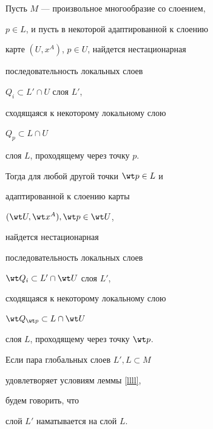 \begin{lem} \label{llll}


Пусть $M$ --- произвольное многообразие со слоением,


$p \in L$, и пусть в некоторой адаптированной к слоению


карте $( U, x^A )$, $p \in U$, найдется нестационарная


последовательность локальных слоев


$Q_{i} \subset L' \cap U$ слоя $L'$,


сходящаяся к некоторому локальному слою


$Q_{p} \subset L \cap U$


слоя $L$, проходящему через точку $p$.


Тогда для любой другой точки $\wt p \in L$ и


адаптированной к слоению карты


$( \wt U, \wt x^A ), \wt p \in \wt U$,


найдется нестационарная


последовательность локальных слоев


$\wt Q_{i} \subset L' \cap \wt U$ слоя $L'$,


сходящаяся к некоторому локальному слою


$\wt Q_{\wt p} \subset L \cap \wt U$


слоя $L$, проходящему через точку $\wt p$.


\end{lem}





Если пара глобальных слоев $L', L\subset M$


удовлетворяет условиям леммы \ref{llll},


будем говорить, что


слой $L'$ наматывается на слой $L$.





